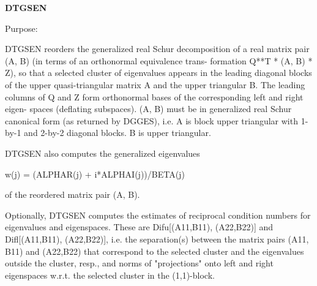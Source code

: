 {\bfseries D\+T\+G\+S\+E\+N} 

 \begin{DoxyParagraph}{Purpose\+: }
\begin{DoxyVerb} DTGSEN reorders the generalized real Schur decomposition of a real
 matrix pair (A, B) (in terms of an orthonormal equivalence trans-
 formation Q**T * (A, B) * Z), so that a selected cluster of eigenvalues
 appears in the leading diagonal blocks of the upper quasi-triangular
 matrix A and the upper triangular B. The leading columns of Q and
 Z form orthonormal bases of the corresponding left and right eigen-
 spaces (deflating subspaces). (A, B) must be in generalized real
 Schur canonical form (as returned by DGGES), i.e. A is block upper
 triangular with 1-by-1 and 2-by-2 diagonal blocks. B is upper
 triangular.

 DTGSEN also computes the generalized eigenvalues

             w(j) = (ALPHAR(j) + i*ALPHAI(j))/BETA(j)

 of the reordered matrix pair (A, B).

 Optionally, DTGSEN computes the estimates of reciprocal condition
 numbers for eigenvalues and eigenspaces. These are Difu[(A11,B11),
 (A22,B22)] and Difl[(A11,B11), (A22,B22)], i.e. the separation(s)
 between the matrix pairs (A11, B11) and (A22,B22) that correspond to
 the selected cluster and the eigenvalues outside the cluster, resp.,
 and norms of "projections" onto left and right eigenspaces w.r.t.
 the selected cluster in the (1,1)-block.\end{DoxyVerb}
 
\end{DoxyParagraph}

